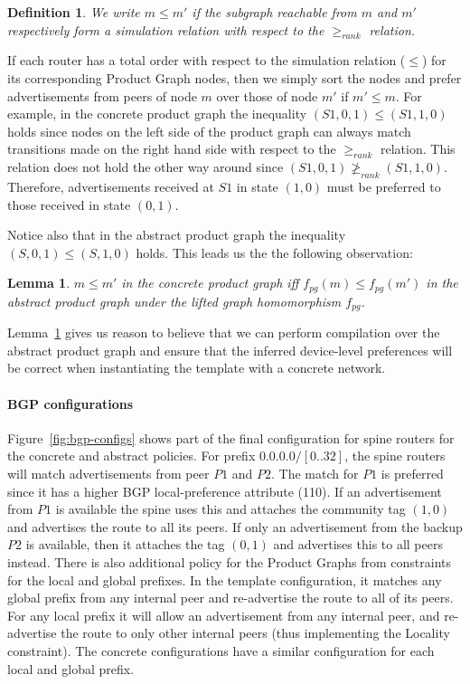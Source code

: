\documentclass[numbers, 10pt, preprint]{sigplanconf}
\newcommand{\para}[1]{\paragraph*{\textbf{#1}}}
\newtheorem{defn}{Definition}
\newtheorem{lem}[thm]{Lemma}
\begin{document}
\begin{defn}
We write $m \leq m'$ if the subgraph reachable from $m$ and $m'$ respectively form a simulation relation with respect to the $\geq_{rank}$ relation.
\end{defn}

If each router has a total order with respect to the simulation relation ($\leq$) for its corresponding Product Graph nodes, then we simply sort the nodes and prefer advertisements from peers of node $m$ over those of node $m'$ if $m' \leq m$.
%
For example, in the concrete product graph the inequality $(S1,0,1) \leq (S1,1,0)$ holds since nodes on the left side of the product graph can always match transitions made on the right hand side with respect to the $\geq_{rank}$ relation. This relation does not hold the other way around since $(S1,0,1) \ngeq_{rank} (S1,1,0)$. Therefore, advertisements received at $S1$ in state $(1,0)$ must be preferred to those received in state $(0,1)$.

Notice also that in the abstract product graph the inequality $(S,0,1) \leq (S,1,0)$ holds. This leads us the the following observation:

\begin{lem}
\label{lem:preference}
$m \leq m'$ in the concrete product graph iff $f_{pg}(m) \leq f_{pg}(m')$ in the abstract product graph under the lifted graph homomorphism $f_{pg}$.
\end{lem}

Lemma~\ref{lem:preference} gives us reason to believe that we can perform compilation over the abstract product graph and ensure that the inferred device-level preferences will be correct when instantiating the template with a concrete network.



\para{BGP configurations}

Figure~\ref{fig:bgp-configs} shows part of the final configuration for spine routers for the concrete and abstract policies.
%
For prefix $0.0.0.0/[0..32]$, the spine routers will match advertisements from peer $P1$ and $P2$. The match for $P1$ is preferred since it has a higher BGP local-preference attribute (110). If an advertisement from $P1$ is available the spine uses this and attaches the community tag $(1,0)$ and advertises the route to all its peers. If only an advertisement from the backup $P2$ is available, then it attaches the tag $(0,1)$ and advertises this to all peers instead.
%
There is also additional policy for the Product Graphs from constraints for the local and global prefixes. In the template configuration, it matches any global prefix from any internal peer and re-advertise the route to all of its peers. For any local prefix it will allow an advertisement from any internal peer, and re-advertise the route to only other internal peers (thus implementing the Locality constraint). The concrete configurations have a similar configuration for each local and global prefix.
\end{document}
